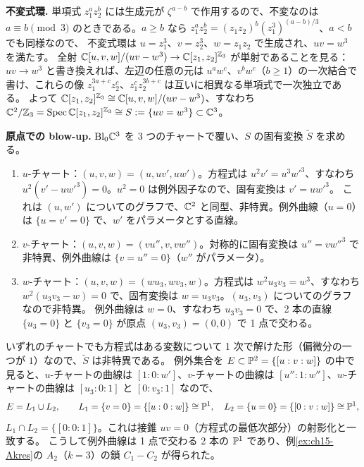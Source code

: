 \textbf{不変式環.}
単項式 $z_1^az_2^b$ には生成元が $\zeta^{a-b}$ で作用するので、不変なのは $a\equiv b\pmod3$ のときである。$a\ge b$ なら $z_1^az_2^b = (z_1z_2)^b(z_1^3)^{(a-b)/3}$、$a<b$ でも同様なので、
不変式環は $u = z_1^3$、$v = z_2^3$、$w = z_1z_2$ で生成され、$uv = w^3$ を満たす。
全射 $\mathbb{C}[u,v,w]/(uv-w^3)\to\mathbb{C}[z_1,z_2]^{\mathbb{Z}_3}$ が単射であることを見る：$uv\to w^3$ と書き換えれば、左辺の任意の元は $u^aw^c$、$v^bw^c$（$b\ge1$）の一次結合で書け、これらの像 $z_1^{3a+c}z_2^c$、$z_1^cz_2^{3b+c}$ は互いに相異なる単項式で一次独立である。
よって $\mathbb{C}[z_1,z_2]^{\mathbb{Z}_3}\cong\mathbb{C}[u,v,w]/(uv-w^3)$、すなわち $\mathbb{C}^2/\mathbb{Z}_3 = \operatorname{Spec}\mathbb{C}[z_1,z_2]^{\mathbb{Z}_3}\cong S := \{uv = w^3\}\subset\mathbb{C}^3$。

\textbf{原点での blow-up.}
$\mathrm{Bl}_0\mathbb{C}^3$ を 3 つのチャートで覆い、$S$ の固有変換 $\tilde S$ を求める。
\begin{enumerate}
\item $u$-チャート：$(u,v,w) = (u,uv',uw')$。方程式は $u^2v' = u^3w'^3$、すなわち $u^2(v'-uw'^3) = 0$。$u^2 = 0$ は例外因子なので、固有変換は $v' = uw'^3$。
これは $(u,w')$ についてのグラフで、$\mathbb{C}^2$ と同型、非特異。例外曲線（$u = 0$）は $\{u = v' = 0\}$ で、$w'$ をパラメータとする直線。
\item $v$-チャート：$(u,v,w) = (vu'',v,vw'')$。対称的に固有変換は $u'' = vw''^3$ で非特異、例外曲線は $\{v = u'' = 0\}$（$w''$ がパラメータ）。
\item $w$-チャート：$(u,v,w) = (wu_3,wv_3,w)$。方程式は $w^2u_3v_3 = w^3$、すなわち $w^2(u_3v_3 - w) = 0$ で、固有変換は $w = u_3v_3$。$(u_3,v_3)$ についてのグラフなので非特異。
例外曲線は $w = 0$、すなわち $u_3v_3 = 0$ で、2 本の直線 $\{u_3 = 0\}$ と $\{v_3 = 0\}$ が原点 $(u_3,v_3) = (0,0)$ で 1 点で交わる。
\end{enumerate}
いずれのチャートでも方程式はある変数について 1 次で解けた形（偏微分の一つが $1$）なので、$\tilde S$ は非特異である。
例外集合を $E\subset\mathbb{P}^2 = \{[u:v:w]\}$ の中で見ると、$u$-チャートの曲線は $[1:0:w']$、$v$-チャートの曲線は $[u'':1:w'']$、$w$-チャートの曲線は $[u_3:0:1]$ と $[0:v_3:1]$ なので、
\[
E = L_1\cup L_2,\qquad L_1 = \{v = 0\} = \{[u:0:w]\}\cong\mathbb{P}^1,\quad L_2 = \{u = 0\} = \{[0:v:w]\}\cong\mathbb{P}^1,
\]
$L_1\cap L_2 = \{[0:0:1]\}$。これは接錐 $uv = 0$（方程式の最低次部分）の射影化と一致する。
こうして例外曲線は 1 点で交わる 2 本の $\mathbb{P}^1$ であり、例\ref{ex:ch15-Akres}の $A_2$（$k = 3$）の鎖 $C_1 - C_2$ が得られた。

\begin{center}
\end{center}

